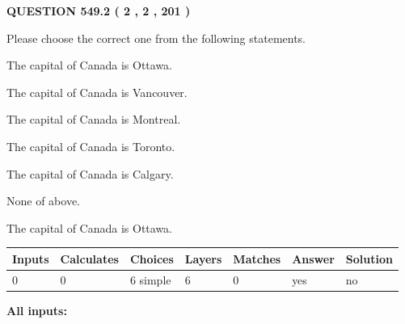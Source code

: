 \documentclass[12pt]{article}
\begin{document}
   
  
\vspace{0.2in}
  
{\textbf{\Large{QUESTION
549.2 
 ( 2 , 2 , 201 )
}}}
  
  
Please choose the correct one from the following statements.
 
 
The capital of Canada is Ottawa.
 
 
The capital of Canada is Vancouver.
 
 
The capital of Canada is Montreal.
 
 
The capital of Canada is Toronto.
 
 
The capital of Canada is Calgary.
 
 
 None of above.
 
 
\noindent{}
 
 
The capital of Canada is Ottawa.
 
 
\noindent{}
 
 
   
   
   
   
\noindent\begin{tabular}{|l|l|l|l|l|l|l|}
 \hline
Inputs & Calculates & Choices & Layers & Matches & Answer & Solution \\ \hline
 0  & 
 0  & 
 6
  simple  
  & 
 6  & 
 0  & 
  yes & 
  no 
  \\ \hline
 \end{tabular}
   
   
   
   
\noindent{}
   
   
   
   
\noindent\vspace{0.1in}\hspace{-0.08in} {\textbf{\Large{All inputs: }}}
   
   
   
   
   
   
 \vspace{0.2in}
 
   
   
\end{document}
